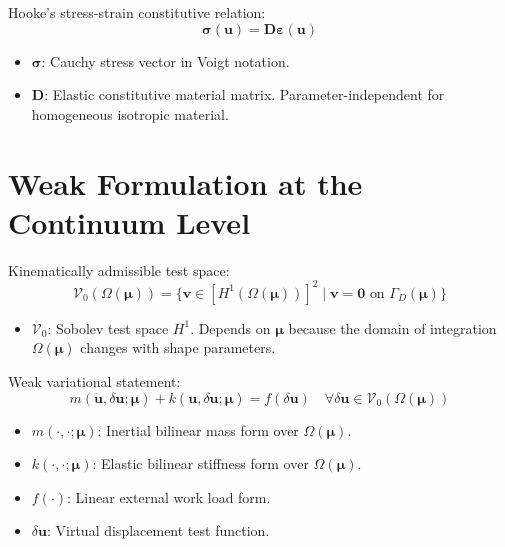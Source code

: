 \documentclass[12pt,a4paper,oneside]{report}
\newcommand{\vect}[1]{\mathbf{#1}}
\newcommand{\mat}[1]{\mathbf{#1}}
\begin{document}
Hooke's stress-strain constitutive relation:
\begin{equation}
    \boldsymbol{\sigma}(\vect{u}) = \mat{D} \boldsymbol{\varepsilon}(\vect{u})
\end{equation}
\begin{tcolorbox}[colback=gray!5!white,colframe=gray!60!black,title={Term Definitions \& Parameter Dependencies}]
\begin{itemize}
    \item $\boldsymbol{\sigma}$: Cauchy stress vector in Voigt notation.
    \item $\mat{D}$: Elastic constitutive material matrix. Parameter-independent for homogeneous isotropic material.
\end{itemize}
\end{tcolorbox}

\section{Weak Formulation at the Continuum Level}

Kinematically admissible test space:
\begin{equation}
    \mathcal{V}_0(\Omega(\boldsymbol{\mu})) = \{ \vect{v} \in [H^1(\Omega(\boldsymbol{\mu}))]^2 \mid \vect{v} = \vect{0} \text{ on } \Gamma_D(\boldsymbol{\mu}) \}
\end{equation}
\begin{tcolorbox}[colback=gray!5!white,colframe=gray!60!black,title={Term Definitions \& Parameter Dependencies}]
\begin{itemize}
    \item $\mathcal{V}_0$: Sobolev test space $H^1$. Depends on $\boldsymbol{\mu}$ because the domain of integration $\Omega(\boldsymbol{\mu})$ changes with shape parameters.
\end{itemize}
\end{tcolorbox}

Weak variational statement:
\begin{equation}
    m(\ddot{\vect{u}}, \delta\vect{u}; \boldsymbol{\mu}) + k(\vect{u}, \delta\vect{u}; \boldsymbol{\mu}) = f(\delta\vect{u}) \quad \forall \delta\vect{u} \in \mathcal{V}_0(\Omega(\boldsymbol{\mu}))
\end{equation}
\begin{tcolorbox}[colback=gray!5!white,colframe=gray!60!black,title={Term Definitions \& Parameter Dependencies}]
\begin{itemize}
    \item $m(\cdot, \cdot; \boldsymbol{\mu})$: Inertial bilinear mass form over $\Omega(\boldsymbol{\mu})$.
    \item $k(\cdot, \cdot; \boldsymbol{\mu})$: Elastic bilinear stiffness form over $\Omega(\boldsymbol{\mu})$.
    \item $f(\cdot)$: Linear external work load form.
    \item $\delta\vect{u}$: Virtual displacement test function.
\end{itemize}
\end{tcolorbox}
\end{document}
